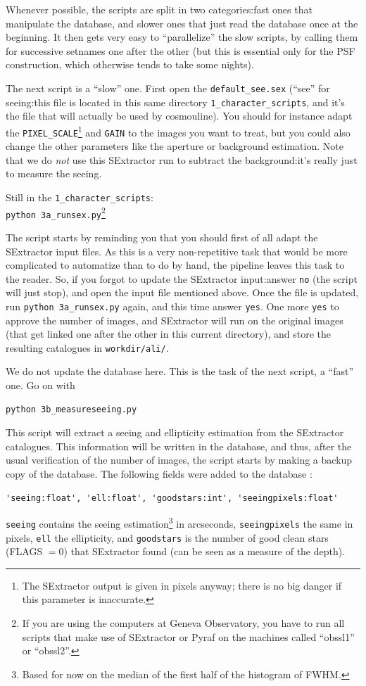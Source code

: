 Whenever possible, the scripts are split in two categories:fast ones that manipulate the database, and slower ones that just read the database once at the beginning. It then gets very easy to ``parallelize'' the slow scripts, by calling them for successive setnames one after the other (but this is essential only for the PSF construction, which otherwise tends to take some nights).

The next script is a ``slow'' one.
First open the \verb+default_see.sex+ (``see'' for seeing:this file is located in this same directory \verb+1_character_scripts+, and it's the file that will actually be used by cosmouline). You should for instance adapt the \verb+PIXEL_SCALE+\footnote{The SExtractor output is given in pixels anyway; there is no big danger if this parameter is inaccurate.} and \verb+GAIN+ to the images you want to treat, but you could also change the other parameters like the aperture or background estimation. Note that we do \emph{not} use this SExtractor run to subtract the background:it's really just to measure the seeing.

Still in the \verb+1_character_scripts+:\\
\verb+python 3a_runsex.py+\footnote{If you are using the computers at Geneva Observatory, you have to run all scripts that make use of SExtractor or Pyraf on the machines called ``obssl1'' or ``obssl2''. }


The script starts by reminding you that you should first of all adapt the SExtractor input files. As this is a very non-repetitive task that would be more complicated to automatize than to do by hand, the pipeline leaves this task to the reader. So, if you forgot to update the SExtractor input:answer \verb+no+ (the script will just stop), and open the input file mentioned above. 
Once the file is updated, run \verb+python 3a_runsex.py+ again, and this time answer \verb+yes+. One more \verb+yes+ to approve the number of images, and SExtractor will run on the original images (that get linked one after the other in this current directory), and store the resulting catalogues in \verb+workdir/ali/+.

We do not update the database here. This is the task of the next script, a ``fast'' one.
Go on with

\begin{Verbatim}
python 3b_measureseeing.py
\end{Verbatim}

This script will extract a seeing and ellipticity estimation from the SExtractor catalogues. This information will be written in the database, and thus, after the usual verification of the number of images, the script starts by making a backup copy of the database.
The following fields were added to the database :
\begin{Verbatim}
'seeing:float', 'ell:float', 'goodstars:int', 'seeingpixels:float'
\end{Verbatim}
\verb+seeing+ contains the seeing estimation\footnote{Based for now on the median of the first half of the histogram of FWHM.} in arcseconds, \verb+seeingpixels+ the same in pixels,  \verb+ell+ the ellipticity, and \verb+goodstars+ is the number of good clean stars (FLAGS $= 0$) that SExtractor found (can be seen as a measure of the depth).


